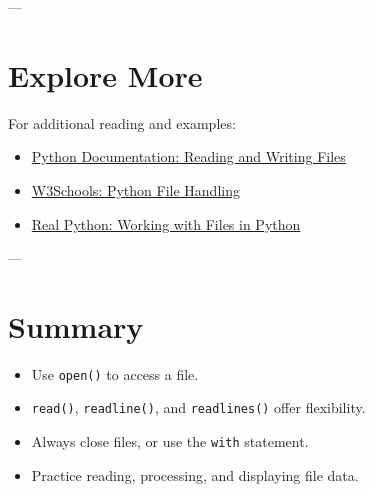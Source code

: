 ---

\section{Explore More}

For additional reading and examples:
\begin{itemize}
  \item \href{https://docs.python.org/3/tutorial/inputoutput.html#reading-and-writing-files}{Python Documentation: Reading and Writing Files}
  \item \href{https://www.w3schools.com/python/python_file_handling.asp}{W3Schools: Python File Handling}
  \item \href{https://realpython.com/read-write-files-python/}{Real Python: Working with Files in Python}
\end{itemize}

---

\section*{Summary}
\begin{itemize}
  \item Use \texttt{open()} to access a file.
  \item \texttt{read()}, \texttt{readline()}, and \texttt{readlines()} offer flexibility.
  \item Always close files, or use the \texttt{with} statement.
  \item Practice reading, processing, and displaying file data.
\end{itemize}

